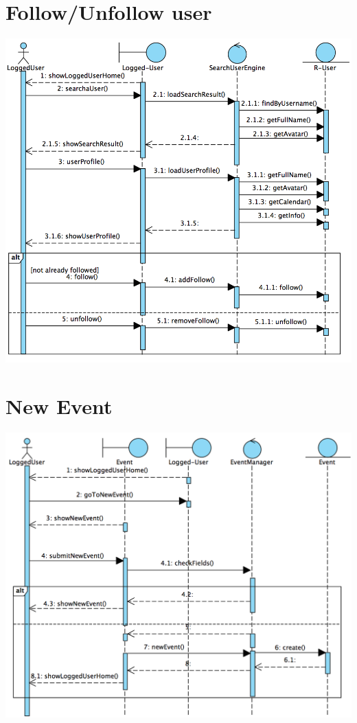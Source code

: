 \documentclass[12pt]{book}
\begin{document}
\section{Follow/Unfollow user}
\vspace{2cm}
\includegraphics[scale=0.5]{follow_SD}
\newpage
\section{New Event}
\vspace{2cm}
\includegraphics[scale=0.45]{newevent_SD}
\newpage
\end{document}
